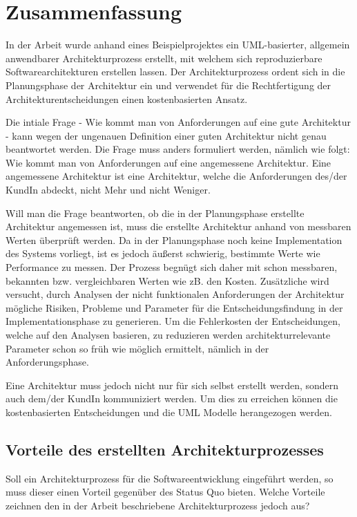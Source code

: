 \chapter{Zusammenfassung}
In der Arbeit wurde anhand eines Beispielprojektes ein UML-basierter, allgemein anwendbarer Architekturprozess erstellt, mit welchem sich reproduzierbare Softwarearchitekturen erstellen lassen. Der Architekturprozess ordent sich in die Planungsphase der Architektur ein und verwendet für die Rechtfertigung der Architekturentscheidungen einen kostenbasierten Ansatz.

Die intiale Frage - Wie kommt man von Anforderungen auf eine gute Architektur - kann wegen der ungenauen Definition einer guten Architektur nicht genau beantwortet werden. Die Frage muss anders formuliert werden, nämlich wie folgt: Wie kommt man von Anforderungen auf eine angemessene Architektur. Eine angemessene Architektur ist eine Architektur, welche die Anforderungen des/der KundIn abdeckt, nicht Mehr und nicht Weniger.

Will man die Frage beantworten, ob die in der Planungsphase erstellte Architektur angemessen ist, muss die erstellte Architektur anhand von messbaren Werten überprüft werden. Da in der Planungsphase noch keine Implementation des Systems vorliegt, ist es jedoch äußerst schwierig, bestimmte Werte wie Performance zu messen. Der Prozess begnügt sich daher mit schon messbaren, bekannten bzw. vergleichbaren Werten wie zB. den Kosten. Zusätzliche wird versucht, durch Analysen der nicht funktionalen Anforderungen der Architektur mögliche Risiken, Probleme und Parameter für die Entscheidungsfindung in der Implementationsphase zu generieren. Um die Fehlerkosten der Entscheidungen, welche auf den Analysen basieren, zu reduzieren werden architekturrelevante Parameter schon so früh wie möglich ermittelt, nämlich in der Anforderungsphase.

Eine Architektur muss jedoch nicht nur für sich selbst erstellt werden, sondern auch dem/der KundIn kommuniziert werden. Um dies zu erreichen können die kostenbasierten Entscheidungen und die UML Modelle herangezogen werden.

\section{Vorteile des erstellten Architekturprozesses}
Soll ein Architekturprozess für die Softwareentwicklung eingeführt werden, so muss dieser einen Vorteil gegenüber des Status Quo bieten. Welche Vorteile zeichnen den in der Arbeit beschriebene Architekturprozess jedoch aus?

